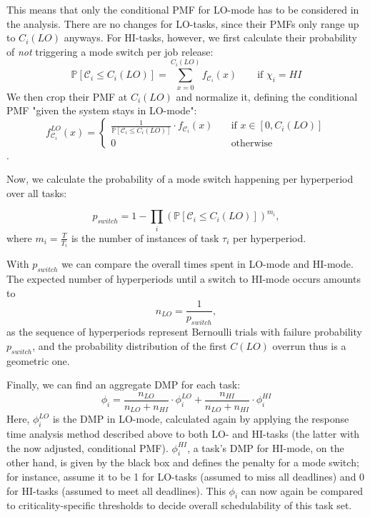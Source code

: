 \documentclass[a4paper,oneside]{csthesis}
\begin{document}
This means that only the conditional PMF for LO-mode has to be considered in the analysis. There are no changes for LO-tasks, since their PMFs only range up to $C_i(LO)$ anyways. For HI-tasks, however, we first calculate their probability of \textit{not} triggering a mode switch per job release:
\begin{equation*}
    \mathbb{P}[\mathcal{C}_i \leq C_i(LO)] = \sum_{x = 0}^{C_i(LO)} f_{\mathcal{C}_{i}}(x) \qquad \mbox{if } \chi_i = HI
\end{equation*}
We then crop their PMF at $C_i(LO)$ and normalize it, defining the conditional PMF "given the system stays in LO-mode":
\begin{equation*}
    f_{\mathcal{C}_{i}}^{LO}(x) = \begin{cases} \frac{1}{\mathbb{P}[\mathcal{C}_i \leq C_i(LO)]} \cdot f_{\mathcal{C}_{i}}(x) &\quad \mbox{if } x \in [0, C_i(LO)] \\ 0 &\quad \mbox{otherwise} \end{cases}
\end{equation*}.

Now, we calculate the probability of a mode switch happening per hyperperiod over all tasks:

\begin{equation*}
    p_{switch} = 1 - \prod_i (\mathbb{P}[\mathcal{C}_i \leq C_i(LO)])^{m_i},
\end{equation*}
where $m_i = \frac{T}{T_i}$ is the number of instances of task $\tau_i$ per hyperperiod.

With $p_{switch}$ we can compare the overall times spent in LO-mode and HI-mode. The expected number of hyperperiods until a switch to HI-mode occurs amounts to 
\begin{equation*}
    n_{LO} = \frac{1}{p_{switch}},
\end{equation*}
as the sequence of hyperperiods represent Bernoulli trials with failure probability $p_{switch}$, and the probability distribution of the first $C(LO)$ overrun thus is a geometric one.

Finally, we can find an aggregate DMP for each task:
\begin{equation*}
    \phi_i = \frac{n_{LO}}{n_{LO} + n_{HI}} \cdot \phi_i^{LO} + \frac{n_{HI}}{n_{LO} + n_{HI}} \cdot \phi_i^{HI}
\end{equation*}
Here, $\phi_i^{LO}$ is the DMP in LO-mode, calculated again by applying the response time analysis method described above to both LO- and HI-tasks (the latter with the now adjusted, conditional PMF). $\phi_i^{HI}$, a task's DMP for HI-mode, on the other hand, is given by the black box and defines the penalty for a mode switch; for instance, assume it to be 1 for LO-tasks (assumed to miss all deadlines) and 0 for HI-tasks (assumed to meet all deadlines). This $\phi_i$ can now again be compared to criticality-specific thresholds to decide overall schedulability of this task set. 
\end{document}
